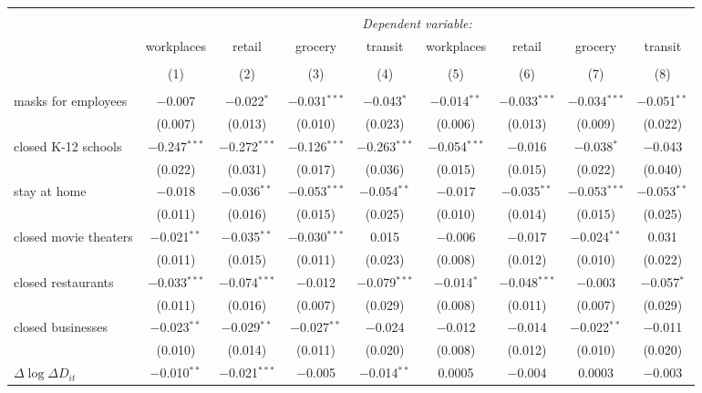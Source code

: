 \begin{tabular}{@{\extracolsep{1pt}}lcccccccc} 
\\[-1.8ex]\hline 
\hline \\[-1.8ex] 
 & \multicolumn{8}{c}{\textit{Dependent variable:}} \\ 
\cline{2-9} 
 & workplaces & retail & grocery & transit & workplaces & retail & grocery & transit \\ 
\\[-1.8ex] & (1) & (2) & (3) & (4) & (5) & (6) & (7) & (8)\\ 
\hline \\[-1.8ex] 
 masks for employees & $-$0.007 & $-$0.022$^{*}$ & $-$0.031$^{***}$ & $-$0.043$^{*}$ & $-$0.014$^{**}$ & $-$0.033$^{***}$ & $-$0.034$^{***}$ & $-$0.051$^{**}$ \\ 
  & (0.007) & (0.013) & (0.010) & (0.023) & (0.006) & (0.013) & (0.009) & (0.022) \\ 
  closed K-12 schools & $-$0.247$^{***}$ & $-$0.272$^{***}$ & $-$0.126$^{***}$ & $-$0.263$^{***}$ & $-$0.054$^{***}$ & $-$0.016 & $-$0.038$^{*}$ & $-$0.043 \\ 
  & (0.022) & (0.031) & (0.017) & (0.036) & (0.015) & (0.015) & (0.022) & (0.040) \\ 
  stay at home & $-$0.018 & $-$0.036$^{**}$ & $-$0.053$^{***}$ & $-$0.054$^{**}$ & $-$0.017 & $-$0.035$^{**}$ & $-$0.053$^{***}$ & $-$0.053$^{**}$ \\ 
  & (0.011) & (0.016) & (0.015) & (0.025) & (0.010) & (0.014) & (0.015) & (0.025) \\ 
  closed movie theaters & $-$0.021$^{**}$ & $-$0.035$^{**}$ & $-$0.030$^{***}$ & 0.015 & $-$0.006 & $-$0.017 & $-$0.024$^{**}$ & 0.031 \\ 
  & (0.011) & (0.015) & (0.011) & (0.023) & (0.008) & (0.012) & (0.010) & (0.022) \\ 
  closed restaurants & $-$0.033$^{***}$ & $-$0.074$^{***}$ & $-$0.012 & $-$0.079$^{***}$ & $-$0.014$^{*}$ & $-$0.048$^{***}$ & $-$0.003 & $-$0.057$^{*}$ \\ 
  & (0.011) & (0.016) & (0.007) & (0.029) & (0.008) & (0.011) & (0.007) & (0.029) \\ 
  closed businesses & $-$0.023$^{**}$ & $-$0.029$^{**}$ & $-$0.027$^{**}$ & $-$0.024 & $-$0.012 & $-$0.014 & $-$0.022$^{**}$ & $-$0.011 \\ 
  & (0.010) & (0.014) & (0.011) & (0.020) & (0.008) & (0.012) & (0.010) & (0.020) \\ 
  $\Delta \log \Delta D_{it}$ & $-$0.010$^{**}$ & $-$0.021$^{***}$ & $-$0.005 & $-$0.014$^{**}$ & 0.0005 & $-$0.004 & 0.0003 & $-$0.003 \\ 

\end{tabular}
